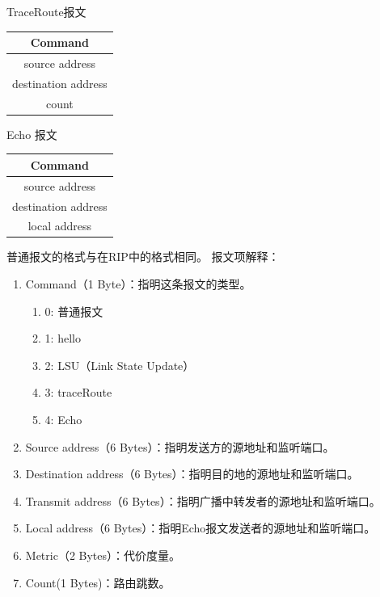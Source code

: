 TraceRoute报文
\begin{table}[H]
	\centering
	\begin{tabular}{|c|}
		\hline              
		Command             \\
		\hline              
		source address      \\
		\hline              
		destination address \\
		\hline              
		count               \\
		\hline              
	\end{tabular}		
\end{table}	

Echo 报文
\begin{table}[H]
	\centering
	\begin{tabular}{|c|}
		\hline              
		Command             \\
		\hline              
		source address      \\
		\hline              
		destination address \\
		\hline              
		local address       \\
		\hline              
	\end{tabular}		
\end{table}
普通报文的格式与在RIP中的格式相同。
报文项解释：
\begin{enumerate}[(1)]
	\item Command（1 Byte）：指明这条报文的类型。
	      \begin{enumerate}[]
	      	\item 0: 普通报文
	      	\item 1: hello
	      	\item 2: LSU（Link State Update）
	      	\item 3: traceRoute
	      	\item 4: Echo
	      \end{enumerate}
	\item Source address（6 Bytes）：指明发送方的源地址和监听端口。
	\item Destination address（6 Bytes）：指明目的地的源地址和监听端口。
	\item Transmit address（6 Bytes）：指明广播中转发者的源地址和监听端口。
	\item Local address（6 Bytes）：指明Echo报文发送者的源地址和监听端口。
	\item Metric（2 Bytes）：代价度量。
	\item Count(1 Bytes)：路由跳数。
\end{enumerate}
	
